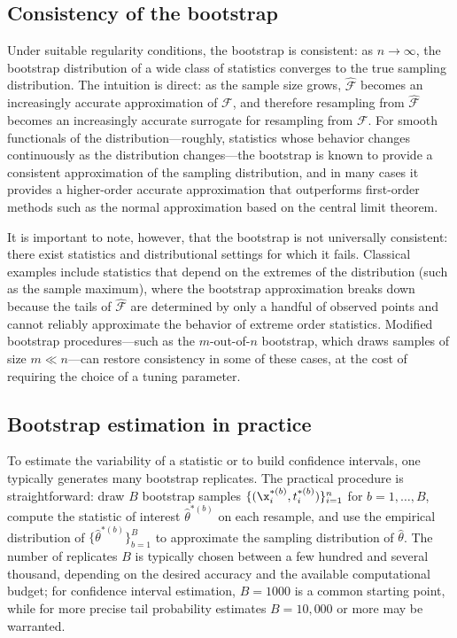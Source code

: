\subsection*{Consistency of the bootstrap}

Under suitable regularity conditions, the bootstrap is \alert{consistent}: as
$n \to \infty$, the bootstrap distribution of a wide class of statistics converges to the
true sampling distribution. The intuition is direct: as the sample size grows,
$\hat{\mathcal{F}}$ becomes an increasingly accurate approximation of $\mathcal{F}$, and therefore resampling from
$\hat{\mathcal{F}}$ becomes an increasingly accurate surrogate for resampling from
$\mathcal{F}$. For smooth functionals of the distribution---roughly, statistics whose
behavior changes continuously as the distribution changes---the bootstrap is known to
provide a consistent approximation of the sampling distribution, and in many cases it
provides a higher-order accurate approximation that outperforms first-order methods such as
the normal approximation based on the central limit theorem.

It is important to note, however, that the bootstrap is not universally consistent: there
exist statistics and distributional settings for which it fails. Classical examples include
statistics that depend on the extremes of the distribution (such as the sample maximum),
where the bootstrap approximation breaks down because the tails of $\hat{\mathcal{F}}$ are
determined by only a handful of observed points and cannot reliably approximate the
behavior of extreme order statistics. Modified bootstrap procedures---such as the
$m$-out-of-$n$ bootstrap, which draws samples of size $m \ll n$---can restore consistency
in some of these cases, at the cost of requiring the choice of a tuning parameter.

\subsection*{Bootstrap estimation in practice}

To estimate the variability of a statistic or to build confidence intervals, one typically
generates many bootstrap replicates. The practical procedure is straightforward: draw $B$
bootstrap samples $\{(\x_i^{*(b)}, t_i^{*(b)})\}_{i=1}^n$ for $b = 1, \ldots, B$, compute
the statistic of interest $\hat{\theta}^{*(b)}$ on each resample, and use the empirical
distribution of $\{\hat{\theta}^{*(b)}\}_{b=1}^B$ to approximate the sampling distribution
of $\hat{\theta}$. The number of replicates $B$ is typically chosen between a few hundred
and several thousand, depending on the desired accuracy and the available computational
budget; for confidence interval estimation, $B = 1000$ is a common starting point, while
for more precise tail probability estimates $B = 10{,}000$ or more may be warranted.

